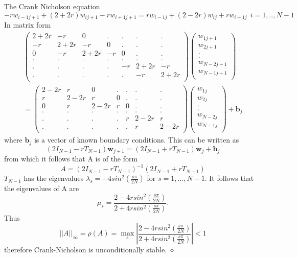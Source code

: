 \begin{example} 
The Crank Nicholson equation
\[
 -rw_{i-1j+1}+(2+2r)w_{ij+1}-rw_{i+1j+1} 
 =rw_{i-1j}+(2-2r)w_{ij}+rw_{i+1j} 
\ \ i=1,..,N-1 \]
In matrix form
\begin{eqnarray*}
\left(\begin{array}{ccccccc}
2+2r&-r&0&.&.&.&.\\
-r&2+2r&-r&0&.&.&.\\
0&-r&2+2r&-r&0&.&.\\
.&.&.&.&.&.&.\\
.&.&.&.&-r&2+2r&-r\\
.&.&.&.&.&-r&2+2r\\
\end{array}\right)
\left(\begin{array}{c}
w_{1j+1}\\
w_{2j+1}\\
.\\
.\\
w_{N-2j+1}\\
w_{N-1j+1}\\
\end{array}\right)\\
=
\left(\begin{array}{ccccccc}
2-2r&r&0&.&.&.&.\\
r&2-2r&r&0&.&.&.\\
0&r&2-2r&r&0&.&.\\
.&.&.&.&.&.&.\\
.&.&.&.&r&2-2r&r\\
.&.&.&.&.&r&2-2r\\
\end{array}\right)
\left(\begin{array}{c}
w_{1j}\\
w_{2j}\\
.\\
.\\
w_{N-2j}\\
w_{N-1j}\\
\end{array}\right)
+\mathbf{b}_j
\end{eqnarray*}
where $\mathbf{b}_j$ is a vector of known boundary conditions. This can be written as
\[(2I_{N-1}-rT_{N-1})\mathbf{w}_{j+1}=(2I_{N-1}+rT_{N-1})\mathbf{w}_{j}+\mathbf{b}_j
\]
from which it follows that A is of the form
\[ A=(2I_{N-1}-rT_{N-1})^{-1}(2I_{N-1}+rT_{N-1}) \]
$T_{N-1}$ has the eigenvalues $\lambda_s=-4sin^2(\frac{s\pi}{2N})$ for $s=1,...,N-1$.
It follows that the eigenvalues of A are 
\[\mu_s=\frac{2-4rsin^2(\frac{s\pi}{2N})}{2+4rsin^2(\frac{s\pi}{2N})}.\]
Thus
\[ ||A||_{\infty}=\rho(A)=\max_s\left|\frac{2-4rsin^2(\frac{s\pi}{2N})}{2+4rsin^2(\frac{s\pi}{2N})}  \right| <1\]
therefore Crank-Nicholson is unconditionally stable.
$\diamond$
\end{example} 
